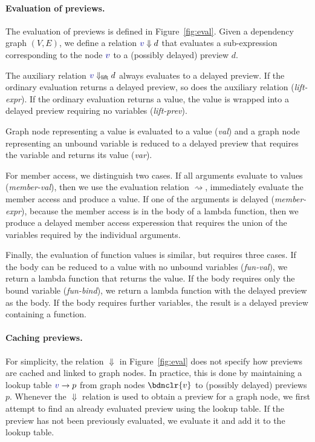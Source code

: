 \documentclass[sigplan,10pt]{acmart}\settopmatter{printfolios=true,printccs=false,printacmref=false}
\newcommand{\ident}[1]{\textnormal{\sffamily #1}}
\newcommand{\bndclr}[1]{\textcolor{kvdclr}{#1}}
\begin{document}
\paragraph{Evaluation of previews.}
The evaluation of previews is defined in Figure~\ref{fig:eval}. Given a dependency graph $(V, E)$,
we define a relation $\bndclr{v}\Downarrow d$ that evaluates a sub-expression corresponding to 
the node $\bndclr{v}$ to a (possibly delayed) preview $d$. 

The auxiliary relation $\bndclr{v}\Downarrow_{\ident{lift}} d$ always evaluates
to a delayed preview. If the ordinary evaluation returns a delayed preview, so does the auxiliary
relation (\emph{lift-expr}). If the ordinary evaluation returns a value, the value is wrapped
into a delayed preview requiring no variables (\emph{lift-prev}).

Graph node representing a value is evaluated to a value (\emph{val}) and a graph node representing
an unbound variable is reduced to a delayed preview that requires the variable and returns its
value (\emph{var}).

For member access, we distinguish two cases. If all arguments evaluate to values (\emph{member-val}),
then we use the evaluation relation $\rightsquigarrow$, immediately evaluate the member access and 
produce a value. If one of the arguments is delayed (\emph{member-expr}), because the member access 
is in the body of a lambda function, then we produce a delayed member access experession that
requires the union of the variables required by the individual arguments.

Finally, the evaluation of function values is similar, but requires three cases. If the body can 
be reduced to a value with no unbound variables (\emph{fun-val}), we return a lambda function that
returns the value. If the body requires only the bound variable (\emph{fun-bind}), we return a 
lambda function with the delayed preview as the body. If the body requires further variables,
the result is a delayed preview containing a function.

\paragraph{Caching previews.}
For simplicity, the relation $\Downarrow$ in Figure~\ref{fig:eval} does not specify how previews 
are cached and linked to graph nodes. In practice, this is done by maintaining a lookup table
$\bndclr{v} \rightarrow p$ from graph nodes $\bdnclr{v}$ to (possibly delayed) previews $p$.
Whenever the $\Downarrow$ relation is used to obtain a preview for a graph node, we first 
attempt to find an already evaluated preview using the lookup table. If the preview has not
been previously evaluated, we evaluate it and add it to the lookup table.
\end{document}
